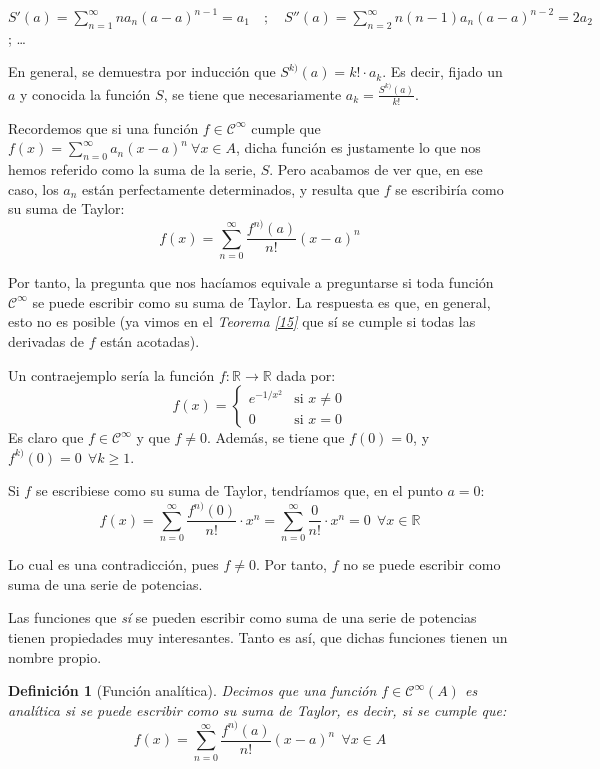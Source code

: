 \documentclass[11pt, a4paper]{article}
\newif\IfInSansMode
\theoremstyle{theorem-style}
\theoremstyle{definition-style}
\newtheorem{ndef}{Definición}[section]
\theoremstyle{remark-style}
\theoremstyle{example-style}
\begin{document}
$\displaystyle S'(a) = \sum_{n=1}^{\infty} na_n(a-a)^{n-1} = a_1 \quad ; \quad S''(a) = \sum_{n=2}^{\infty} n(n-1)a_n(a-a)^{n-2} = 2a_2$ \quad ; \quad \dots

En general, se demuestra por inducción que $S^{k)} (a) = k! \cdot a_k$. Es decir, fijado un $a$ y conocida la función $S$, se tiene que necesariamente $a_k = \frac{S^{k)}(a)}{k!}$.

Recordemos que si una función $f \in \mathcal{C}^{\infty}$ cumple que $f(x) = \sum_{n=0}^{\infty} a_n(x-a)^n\ \forall x \in A$, dicha función es justamente lo que nos hemos referido como la suma de la serie, $S$. Pero acabamos de ver que, en ese caso, los $a_n$ están perfectamente determinados, y resulta que $f$ se escribiría como su suma de Taylor: $$f(x) = \sum_{n=0}^{\infty} \frac{f^{n)}(a)}{n!} (x-a)^n$$

Por tanto, la pregunta que nos hacíamos equivale a preguntarse si toda función $\mathcal{C}^{\infty}$ se puede escribir como su suma de Taylor. La respuesta es que, en general, esto no es posible (ya vimos en el \textit{Teorema \ref{15}} que sí se cumple si todas las derivadas de $f$ están acotadas).

Un contraejemplo sería la función $f: \mathbb{R} \longrightarrow \mathbb{R}$ dada por: $$f(x) = \begin{cases}
  e^{-1/x^2} & \text{si } x\ne 0\\
  0 & \text{si } x=0
\end{cases}$$ Es claro que $f \in \mathcal{C}^{\infty}$ y que $f \ne 0$. Además, se tiene que $f(0) = 0$, y $f^{k)}(0) = 0\ \ \forall k \ge 1$. 

Si $f$ se escribiese como su suma de Taylor, tendríamos que, en el punto $a=0$: $$f(x) = \sum_{n=0}^{\infty} \frac{f^{n)}(0)}{n!} \cdot x^n =  \sum_{n=0}^{\infty} \frac{0}{n!}\cdot x^n = 0\ \ \forall x \in \mathbb{R}$$

Lo cual es una contradicción, pues $f\ne 0$. Por tanto, $f$ no se puede escribir como suma de una serie de potencias.

Las funciones que \textit{sí} se pueden escribir como suma de una serie de potencias tienen propiedades muy interesantes. Tanto es así, que dichas funciones tienen un nombre propio.

\begin{ndef}[Función analítica] Decimos que una función $f \in \mathcal{C}^{\infty}(A)$ es analítica si se puede escribir como su suma de Taylor, es decir, si se cumple que: $$f(x) = \sum_{n=0}^{\infty} \frac{f^{n)}(a)}{n!}(x-a)^n\ \ \forall x \in A$$
\end{ndef}
\end{document}
